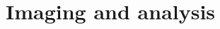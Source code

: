 \documentclass{beamer}%
\newcommand{\hs}{head-sweep}
\begin{document}
%
%
%
%
%
%

\section{Imaging and analysis}


%
%
\end{document}
